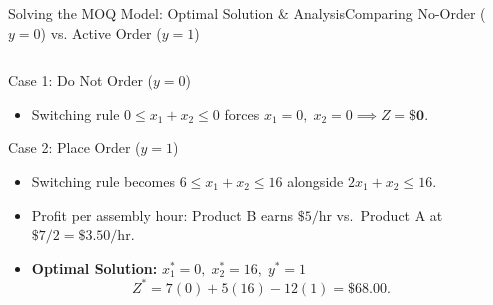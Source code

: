 \documentclass[aspectratio=169]{beamer}
\begin{document}
\begin{frame}{Solving the MOQ Model: Optimal Solution \& Analysis}{Comparing No-Order ($y=0$) vs. Active Order ($y=1$)}
\begin{columns}[T]
\begin{column}{0.50\textwidth}
  \footnotesize
  \begin{block}{Case 1: Do Not Order ($y=0$)}
    \begin{itemize}
      \item Switching rule $0 \le x_1 + x_2 \le 0$ forces $x_1 = 0, \; x_2 = 0 \implies Z = \mathbf{\$0}$.
    \end{itemize}
  \end{block}
  \begin{block}{Case 2: Place Order ($y=1$)}
    \begin{itemize}
      \item Switching rule becomes $6 \le x_1 + x_2 \le 16$ alongside $2x_1 + x_2 \le 16$.
      \item Profit per assembly hour: Product B earns $\$5/\text{hr}$ vs.\ Product A at $\$7/2 = \$3.50/\text{hr}$.
      \item \textbf{Optimal Solution:} $x_1^* = 0, \; x_2^* = 16, \; y^* = 1$
      \[
        Z^* = 7(0) + 5(16) - 12(1) = \mathbf{\$68.00}.
      \]
    \end{itemize}
  \end{block}
\end{column}
\begin{column}{0.47\textwidth}
  \centering
\end{column}
\end{columns}
\end{frame}
\end{document}
